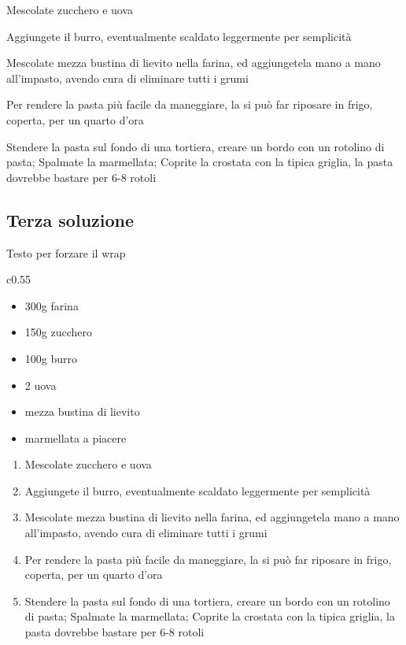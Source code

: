 \documentclass[a4paper,11pt]{book}
\begin{document}
Mescolate zucchero e uova

Aggiungete il burro, eventualmente scaldato leggermente per semplicit\`a

Mescolate mezza bustina di lievito nella farina, ed aggiungetela mano a mano all'impasto, avendo cura di eliminare tutti i grumi

Per rendere la pasta pi\`u facile da maneggiare, la si pu\`o far riposare in frigo, coperta, per un quarto d'ora

Stendere la pasta sul fondo di una tortiera, creare un bordo con un rotolino di pasta;
Spalmate la marmellata;
Coprite la crostata con la tipica griglia, la pasta dovrebbe bastare per 6-8 rotoli

\subsection{Terza soluzione}

Testo per forzare il wrap
\begin{wrapfigure}{c}{0.55\linewidth}
    \begin{itemize}
        \item 300g farina
        \item 150g zucchero
        \item 100g burro
        \item 2 uova
        \item mezza bustina di lievito
        \item marmellata a piacere
    \end{itemize}
\end{wrapfigure}%
\begin{enumerate}
    \item Mescolate zucchero e uova
    \item Aggiungete il burro, eventualmente scaldato leggermente per semplicit\`a
    \item Mescolate mezza bustina di lievito nella farina, ed aggiungetela mano a mano all'impasto, avendo cura di eliminare tutti i grumi
    \item Per rendere la pasta pi\`u facile da maneggiare, la si pu\`o far riposare in frigo, coperta, per un quarto d'ora
    \item Stendere la pasta sul fondo di una tortiera, creare un bordo con un rotolino di pasta;
        Spalmate la marmellata;
        Coprite la crostata con la tipica griglia, la pasta dovrebbe bastare per 6-8 rotoli
\end{enumerate}
\end{document}
